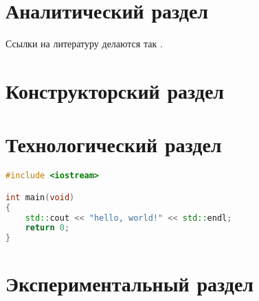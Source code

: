 \chapter{Аналитический раздел}

Ссылки на литературу делаются так \cite{test-ref}.

\chapter{Конструкторский раздел}

\chapter{Технологический раздел}

\begin{lstlisting}[language=C++,caption=Пример листинга]
#include <iostream>

int main(void)
{
	std::cout << "hello, world!" << std::endl;
	return 0;
}
\end{lstlisting}

\chapter{Экспериментальный раздел}
